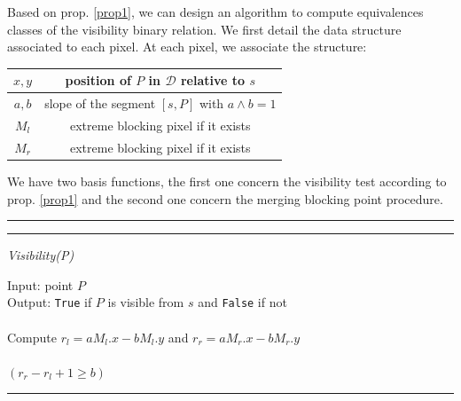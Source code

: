 \documentclass{llncs}
\begin{document}
Based on prop. \ref{prop1}, we can design an algorithm to compute equivalences classes of the
visibility binary relation. We first detail the data structure associated to each pixel. At each
pixel, we associate  the structure:

\begin{center}
\begin{tabular}{|c|c|}
\hline
$x,y$ & position of $P$ in $\mathcal{D}$ relative to $s$\\
\hline$a,b$ & slope of the segment $[s,P]$ with $a\wedge b=1$\\
\hline$M_l$& extreme blocking pixel if it exists\\
\hline$M_r$ & extreme blocking pixel if it exists\\
\hline
\end{tabular}
\end{center}


We have two basis functions, the first one concern the visibility test according to
prop. \ref{prop1} and the second one concern the merging blocking point procedure.


\footnotesize
\vspace{0.5cm}
\hrule\hrule\vspace*{0.3cm}
\centerline{{\it Visibility(P)}}
\noindent \textsf{Input: point $P$\\
\noindent Output: {\tt True} if $P$ is visible from $s$ and {\tt False} if not\\
\\
\hspace*{0.5cm} Compute $r_l=aM_l.x-bM_l.y$ and $r_r=aM_r.x-bM_r.y$\\
\hspace*{1cm}{\it (if $M_l$ (resp. $M_l$) is not defined $r_l=-b$ (resp. $r_r=b$))}\\
\hspace*{0.5cm}{\bf Return} $(r_r-r_l+1 \geq b)$\\
}
\hrule
\normalsize
\end{document}
